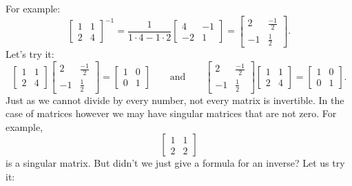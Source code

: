 \documentclass{ximera}
\begin{document}
For example:
\begin{equation*}
    \begin{bmatrix}
        1 & 1 \\
        2 & 4
    \end{bmatrix}^{-1}
    = \frac{1}{1\cdot 4-1 \cdot 2}
    \begin{bmatrix}
        4 & -1 \\
        -2 & 1
    \end{bmatrix}
    =
    \begin{bmatrix}
        2 & \frac{-1}{2} \\
        -1 & \frac{1}{2}
    \end{bmatrix} .
\end{equation*}
Let's try it:
\begin{equation*}
    \begin{bmatrix}
        1 & 1 \\
        2 & 4
    \end{bmatrix}
    \begin{bmatrix}
        2 & \frac{-1}{2} \\
        -1 & \frac{1}{2}
    \end{bmatrix}
    =
    \begin{bmatrix}
        1 & 0 \\
        0 & 1
    \end{bmatrix}
    \qquad \text{and} \qquad
    \begin{bmatrix}
        2 & \frac{-1}{2} \\
        -1 & \frac{1}{2}
    \end{bmatrix}
    \begin{bmatrix}
        1 & 1 \\
        2 & 4
    \end{bmatrix}
    =
    \begin{bmatrix}
        1 & 0 \\
        0 & 1
    \end{bmatrix} .
\end{equation*}
Just as we cannot divide by every number, not every matrix is invertible.  In the case of matrices however we may have singular matrices that are not zero.  For example,
\begin{equation*}
    \begin{bmatrix}
        1 & 1 \\
        2 & 2
    \end{bmatrix}
\end{equation*}
is a singular matrix. But didn't we just give a formula for an inverse? Let us try it:
\end{document}
